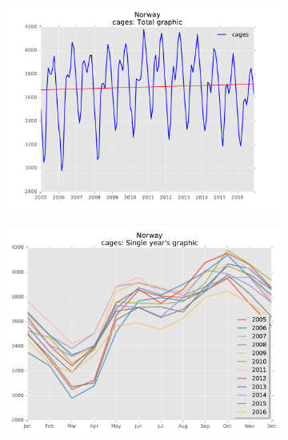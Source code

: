 \begin{figure}[H]
\begin{subfigure}{.5\textwidth}
	\centering
    \includegraphics[width=1\textwidth]{Files/Cages_Total.pdf}
    
\end{subfigure}%
\begin{subfigure}{.5\textwidth}
	\centering
    \includegraphics[width=1\textwidth]{Files/Cages_Years.pdf}
\end{subfigure}%
\end{figure} 


